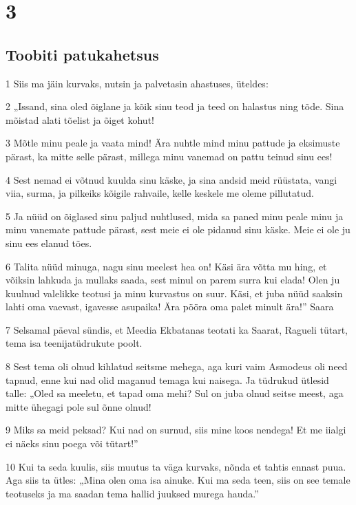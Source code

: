 \chapter{3}

\section*{Toobiti patukahetsus}

\par 1 Siis ma jäin kurvaks, nutsin ja palvetasin ahastuses, üteldes:
\par 2 „Issand, sina oled õiglane ja kõik sinu teod ja teed on halastus  ning tõde. Sina mõistad alati tõelist ja õiget kohut!
\par 3 Mõtle minu peale ja vaata mind! Ära nuhtle mind minu pattude ja  eksimuste pärast, ka mitte selle pärast, millega minu vanemad on pattu  teinud sinu ees!
\par 4 Sest nemad ei võtnud kuulda sinu käske, ja sina andsid meid  rüüstata, vangi viia, surma, ja pilkeiks kõigile rahvaile, kelle  keskele me oleme pillutatud.
\par 5 Ja nüüd on õiglased sinu paljud nuhtlused, mida sa paned minu  peale minu ja minu vanemate pattude pärast, sest meie ei ole pidanud  sinu käske. Meie ei ole ju sinu ees elanud tões.
\par 6 Talita nüüd minuga, nagu sinu meelest hea on! Käsi ära võtta mu  hing, et võiksin lahkuda ja mullaks saada, sest minul on parem surra  kui elada! Olen ju kuulnud valelikke teotusi ja minu kurvastus on  suur. Käsi, et juba nüüd saaksin lahti oma vaevast, igavesse  asupaika! Ära pööra oma palet minult ära!” Saara
\par 7 Selsamal päeval sündis, et Meedia Ekbatanas teotati ka Saarat,  Ragueli tütart, tema isa teenijatüdrukute poolt.
\par 8 Sest tema oli olnud kihlatud seitsme mehega, aga kuri vaim  Asmodeus oli  need tapnud, enne kui nad olid maganud temaga kui naisega. Ja tüdrukud  ütlesid talle: „Oled sa meeletu, et tapad oma mehi? Sul on juba  olnud seitse meest, aga mitte ühegagi pole sul õnne olnud!
\par 9 Miks sa meid peksad? Kui nad on surnud, siis mine koos nendega!  Et me iialgi ei näeks sinu poega või tütart!”
\par 10 Kui ta seda kuulis, siis muutus ta väga kurvaks, nõnda et  tahtis ennast puua. Aga siis ta ütles: „Mina olen oma isa ainuke. Kui  ma seda teen, siis on see temale teotuseks ja ma saadan tema hallid  juuksed murega hauda.”
